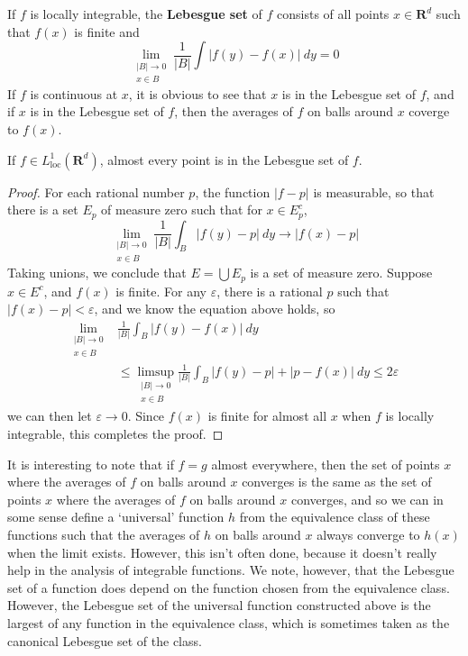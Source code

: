 If $f$ is locally integrable, the {\bf Lebesgue set} of $f$ consists of all points $x \in \mathbf{R}^d$ such that $f(x)$ is finite and
%
\[ \lim_{\substack{|B| \to 0\\x \in B}} \frac{1}{|B|} \int |f(y) - f(x)|\ dy = 0 \]
%
If $f$ is continuous at $x$, it is obvious to see that $x$ is in the Lebesgue set of $f$, and if $x$ is in the Lebesgue set of $f$, then the averages of $f$ on balls around $x$ coverge to $f(x)$.

\begin{theorem}
    If $f \in L^1_{\text{loc}}(\mathbf{R}^d)$, almost every point is in the Lebesgue set of $f$.
\end{theorem}
\begin{proof}
    For each rational number $p$, the function $|f - p|$ is measurable, so that there is a set $E_p$ of measure zero such that for $x \in E_p^c$,
    \[ \lim_{\substack{|B| \to 0\\x \in B}} \frac{1}{|B|} \int_B |f(y) - p|\ dy \to |f(x) - p| \]
    Taking unions, we conclude that $E = \bigcup E_p$ is a set of measure zero. Suppose $x \in E^c$, and $f(x)$ is finite. For any $\varepsilon$, there is a rational $p$ such that $|f(x) - p| < \varepsilon$, and we know the equation above holds, so
    \begin{align*}
        \lim_{\substack{|B| \to 0\\x \in B}} &\frac{1}{|B|} \int_B |f(y) - f(x)|\ dy\\
        &\leq \limsup_{\substack{|B| \to 0\\x \in B}} \frac{1}{|B|} \int_B |f(y) - p| + |p - f(x)|\ dy \leq 2\varepsilon
    \end{align*}
    we can then let $\varepsilon \to 0$. Since $f(x)$ is finite for almost all $x$ when $f$ is locally integrable, this completes the proof.
\end{proof}

It is interesting to note that if $f = g$ almost everywhere, then the set of points $x$ where the averages of $f$ on balls around $x$ converges is the same as the set of points $x$ where the averages of $f$ on balls around $x$ converges, and so we can in some sense define a `universal' function $h$ from the equivalence class of these functions such that the averages of $h$ on balls around $x$ always converge to $h(x)$ when the limit exists. However, this isn't often done, because it doesn't really help in the analysis of integrable functions. We note, however, that the Lebesgue set of a function does depend on the function chosen from the equivalence class. However, the Lebesgue set of the universal function constructed above is the largest of any function in the equivalence class, which is sometimes taken as the canonical Lebesgue set of the class.

